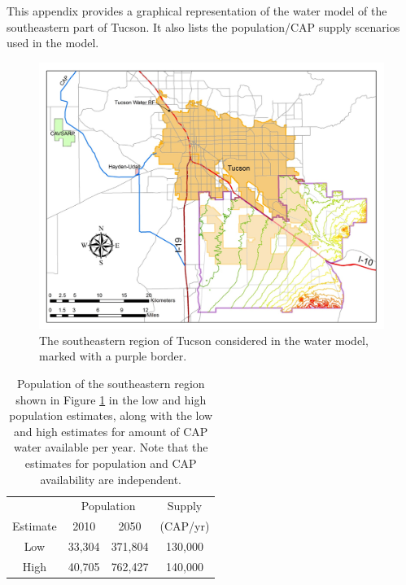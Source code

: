 \documentclass[12pt]{amsart}
\begin{document}
\bigskip 

This appendix provides a graphical representation of the water model of the southeastern part of Tucson. It also lists the population/CAP supply scenarios used in the model.\medskip  

\begin{figure}[!ht]
	\centering
	\includegraphics[width=.8\textwidth]{images/tucson_elevation}
	\caption{
		The southeastern region of Tucson considered in the water model, marked with a purple border.
	}
	\label{fig:tucson_map}
\end{figure}


\begin{table}[!ht]
	\centering
	\begin{tabular}{|c|cc||c|}
		\hline
		& \multicolumn{2}{|c||}{Population} & Supply \\
		Estimate & 2010 & 2050 & (CAP/yr) \\
		\hline
		\hline
		Low  & 33,304 & 371,804 & 130,000 \\
		\hline
		High & 40,705 & 762,427 & 140,000 \\
		\hline
	\end{tabular}\medskip
	\caption{
		Population of the southeastern region shown in Figure \ref{fig:tucson_map} in the low and high population estimates, along with the low and high estimates for amount of CAP water available per year.
		Note that the estimates for population and CAP availability are independent.
	}
	\label{tab:scenario_description}
\end{table}
\end{document}

